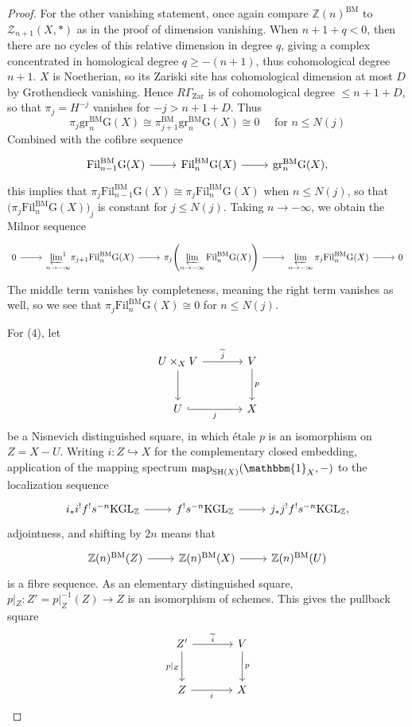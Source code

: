 \documentclass[11pt, twoside]{article}
\numberwithin{equation}{section}
\theoremstyle{definition}
\newcommand{\bb}[1]{\mathbb{#1}}
\newcommand{\catlim}{\varprojlim}
\newcommand{\map}{\mathrm{map}}
\newcommand{\fil}{\mathrm{Fil}}
\newcommand{\gr}{\mathrm{gr}}
\newcommand{\Kgl}{\mathrm{KGL}}
\newcommand{\sh}{\mathrm{SH}}
\newcommand{\bm}{\mathrm{BM}}
\newcommand{\G}{\mathrm{G}}
\begin{document}
\begin{proof}
For the other vanishing statement, once again compare \(\bb{Z}(n)^\bm\) to \(\mathcal{Z}_{n + 1}(X, *)\) as in the proof of dimension vanishing. When \(n + 1 + q < 0\), then there are no cycles of this relative dimension in degree \(q\), giving a complex concentrated in homological degree \(q \geq - (n + 1)\), thus cohomological degree \(n + 1\). \(X\) is Noetherian, so its Zariski site has cohomological dimension at most \(D\) by Grothendieck vanishing. Hence \(R\Gamma_\mathrm{Zar}\) is of cohomological degree \(\leq n + 1 + D\), so that \(\pi_j = H^{- j}\) vanishes for \(- j > n + 1 + D\). Thus 
\[\pi_j \gr_n^\bm \G(X) \cong \pi_{j + 1}^\bm \gr_n^\bm \G(X) \cong 0 \quad \text{ for } n \leq N(j)\]
Combined with the cofibre sequence 
\[\begin{tikzcd}
\fil_{n - 1}^\bm \G(X) \ar[r] & \fil_n^\bm \G(X) \ar[r] & \gr_n^\bm \G(X),
\end{tikzcd}\]
this implies that \(\pi_j \fil_{n - 1}^\bm \G(X) \cong \pi_j \fil_n^\bm \G(X)\) when \(n \leq N(j)\), so that \(\big(\pi_j \fil_n^\bm \G(X)\big)_j\) is constant for \(j \leq N(j)\). Taking \(n \to - \infty\), we obtain the Milnor sequence 
\[\begin{tikzcd}
0 \ar[r] & \underset{n \to - \infty}{\catlim^1} \pi_{j + 1} \fil_n^\bm \G(X) \ar[r] & \displaystyle \pi_j \! \left(\catlim_{n \to - \infty} \fil_n^\bm \G(X)\right) \ar[r] & \displaystyle \catlim_{n \to - \infty} \pi_j \fil_n^\bm \G(X) \ar[r] & 0
\end{tikzcd}\]
The middle term vanishes by completeness, meaning the right term vanishes as well, so we see that \(\pi_j \fil_n^\bm \G(X) \cong 0\) for \(n \leq N(j)\).

For (4), let 
\[\begin{tikzcd} [row sep = large, column sep = large]
U \times_X V \ar[d] \ar[r, "\tilde{j}"] & V \ar[d, "p"]\\
U \ar[r, "j", swap, hookrightarrow] & X
\end{tikzcd}\]
be a Nisnevich distinguished square, in which étale \(p\) is an isomorphism on \(Z = X - U\). Writing \(i \colon Z \hookrightarrow X\) for the complementary closed embedding, application of the mapping spectrum \(\map_{\sh(X)}(\mathbbm{1}_X, -)\) to the localization sequence 
\begin{equation}\label{eq:nis-ex}
\begin{tikzcd} 
i_*i^! f^! s^{- n} \Kgl_\bb{Z} \ar[r] & f^! s^{- n} \Kgl_\bb{Z} \ar[r] & j_*j^! f^! s^{- n} \Kgl_\bb{Z},
\end{tikzcd}
\end{equation}
adjointness, and shifting by \(2n\) means that 
\[\begin{tikzcd}
\bb{Z}(n)^\bm(Z) \ar[r] & \bb{Z}(n)^\bm(X) \ar[r] & \bb{Z}(n)^\bm(U)
\end{tikzcd}\]
is a fibre sequence. As an elementary distinguished square, \(p|_Z \colon Z' = p|_Z^{- 1}(Z) \to Z\) is an isomorphism of schemes. This gives the pullback square 
\[\begin{tikzcd} [row sep = large, column sep = large]
Z' \ar[d, "p|_Z", swap] \ar[r, "\tilde{i}"] & V \ar[d, "p"]\\
Z \ar[r, "i", swap] & X
\end{tikzcd}\]


\end{proof}
\end{document}
